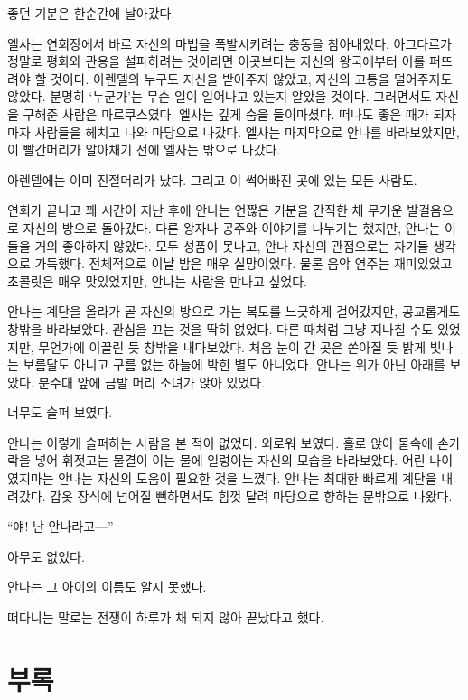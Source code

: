 좋던 기분은 한순간에 날아갔다.

엘사는 연회장에서 바로 자신의 마법을 폭발시키려는 충동을 참아내었다. 아그다르가 정말로 평화와 관용을 설파하려는 것이라면 이곳보다는 자신의 왕국에부터 이를 퍼뜨려야 할 것이다. 아렌델의 누구도 자신을 받아주지 않았고, 자신의 고통을 덜어주지도 않았다. 분명히 `누군가'는 무슨 일이 일어나고 있는지 알았을 것이다. 그러면서도 자신을 구해준 사람은 마르쿠스였다. 엘사는 깊게 숨을 들이마셨다. 떠나도 좋은 때가 되자마자 사람들을 헤치고 나와 마당으로 나갔다. 엘사는 마지막으로 안나를 바라보았지만, 이 빨간머리가 알아채기 전에 엘사는 밖으로 나갔다.

아렌델에는 이미 진절머리가 났다. 그리고 이 썩어빠진 곳에 있는 모든 사람도.

\textbreak

연회가 끝나고 꽤 시간이 지난 후에 안나는 언짢은 기분을 간직한 채 무거운 발걸음으로 자신의 방으로 돌아갔다. 다른 왕자나 공주와 이야기를 나누기는 했지만, 안나는 이들을 거의 좋아하지 않았다. 모두 성품이 못나고, 안나 자신의 관점으로는 자기들 생각으로 가득했다. 전체적으로 이날 밤은 매우 실망이었다. 물론 음악 연주는 재미있었고 초콜릿은 매우 맛있었지만, 안나는 사람을 만나고 싶었다. 

안나는 계단을 올라가 곧 자신의 방으로 가는 복도를 느긋하게 걸어갔지만, 공교롭게도 창밖을 바라보았다. 관심을 끄는 것을 딱히 없었다. 다른 때처럼 그냥 지나칠 수도 있었지만, 무언가에 이끌린 듯 창밖을 내다보았다. 처음 눈이 간 곳은 쏟아질 듯 밝게 빛나는 보름달도 아니고 구름 없는 하늘에 박힌 별도 아니었다. 안나는 위가 아닌 아래를 보았다. 분수대 앞에 금발 머리 소녀가 앉아 있었다.

너무도 슬퍼 보였다.

안나는 이렇게 슬퍼하는 사람을 본 적이 없었다. 외로워 보였다. 홀로 앉아 물속에 손가락을 넣어 휘젓고는 물결이 이는 물에 일렁이는 자신의 모습을 바라보았다. 어린 나이였지마는 안나는 자신의 도움이 필요한 것을 느꼈다. 안나는 최대한 빠르게 계단을 내려갔다. 갑옷 장식에 넘어질 뻔하면서도 힘껏 달려 마당으로 향하는 문밖으로 나왔다.

``얘! 난 안나라고—''

아무도 없었다.

안나는 그 아이의 이름도 알지 못했다.

\textbreak

떠다니는 말로는 전쟁이 하루가 채 되지 않아 끝났다고 했다.

\chapter{부록}

